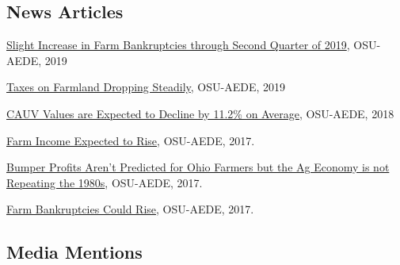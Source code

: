 \documentclass[letterpaper]{article}
\renewenvironment{itemize}{
  \begin{list}{}{
    \setlength{\leftmargin}{1.5em}
  }
}{
  \end{list}
}
\begin{document}
\subsection*{News Articles}

\begin{itemize}
\item \href{https://aede.osu.edu/sites/aede/files/publication_files/BankruptcyUpdate2019Q2.pdf}{Slight Increase in Farm Bankruptcies through Second Quarter of 2019}, OSU-AEDE, 2019
\item \href{https://aede.osu.edu/news/taxes-farmland-dropping-steadily}{Taxes on Farmland Dropping Steadily}, OSU-AEDE, 2019
\item \href{https://aede.osu.edu/news/cauv-values-agricultural-land-are-expected-decline-112-acre-average}{CAUV Values are Expected to Decline by 11.2\% on Average}, OSU-AEDE, 2018
\item \href{https://aede.osu.edu/news/farm-income-expected-rise}{Farm Income Expected to Rise}, OSU-AEDE, 2017.
\item \href{https://aede.osu.edu/news/bumper-profits-arent-predicted-ohio-farmers-ag-economy-not-repeating-1980s}{Bumper Profits Aren't Predicted for Ohio Farmers but the Ag Economy is not Repeating the 1980s}, OSU-AEDE, 2017.
\item \href{https://aede.osu.edu/news/farm-bankruptcies-could-rise}{Farm Bankruptcies Could Rise}, OSU-AEDE, 2017.
\end{itemize}

\subsection*{Media Mentions}
\end{document}
